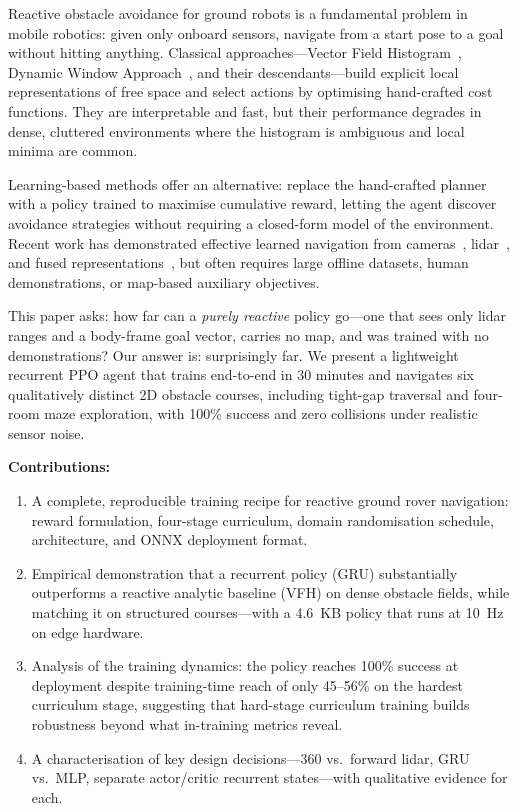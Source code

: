 \documentclass[letterpaper, 10pt, journal]{IEEEtran}
\begin{document}
Reactive obstacle avoidance for ground robots is a fundamental problem in mobile
robotics: given only onboard sensors, navigate from a start pose to a goal without
hitting anything. Classical approaches---Vector Field Histogram~\cite{vfh},
Dynamic Window Approach~\cite{dwa}, and their descendants---build explicit local
representations of free space and select actions by optimising hand-crafted cost
functions. They are interpretable and fast, but their performance degrades in dense,
cluttered environments where the histogram is ambiguous and local minima are common.

Learning-based methods offer an alternative: replace the hand-crafted planner with a
policy trained to maximise cumulative reward, letting the agent discover avoidance
strategies without requiring a closed-form model of the environment. Recent work has
demonstrated effective learned navigation from cameras~\cite{shah2023gnm},
lidar~\cite{tai2017virtual, zhelo2018curiosity}, and fused
representations~\cite{fang2019scene}, but often requires large offline datasets,
human demonstrations, or map-based auxiliary objectives.

This paper asks: how far can a \emph{purely reactive} policy go---one that sees only
lidar ranges and a body-frame goal vector, carries no map, and was trained with no
demonstrations? Our answer is: surprisingly far. We present a lightweight recurrent
PPO agent that trains end-to-end in 30 minutes and navigates six qualitatively
distinct 2D obstacle courses, including tight-gap traversal and four-room maze
exploration, with 100\% success and zero collisions under realistic sensor noise.

\textbf{Contributions:}
\begin{enumerate}
  \item A complete, reproducible training recipe for reactive ground rover navigation:
    reward formulation, four-stage curriculum, domain randomisation schedule,
    architecture, and ONNX deployment format.
  \item Empirical demonstration that a recurrent policy (GRU) substantially
    outperforms a reactive analytic baseline (VFH) on dense obstacle fields, while
    matching it on structured courses---with a 4.6~KB policy that runs at 10~Hz on
    edge hardware.
  \item Analysis of the training dynamics: the policy reaches 100\% success at
    deployment despite training-time reach of only 45--56\% on the hardest curriculum
    stage, suggesting that hard-stage curriculum training builds robustness beyond
    what in-training metrics reveal.
  \item A characterisation of key design decisions---360\textdegree{} vs.\ forward
    lidar, GRU vs.\ MLP, separate actor/critic recurrent states---with qualitative
    evidence for each.
\end{enumerate}
\end{document}
